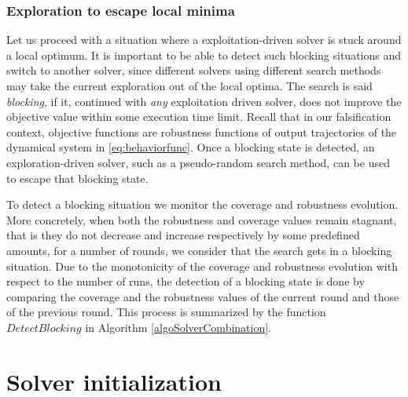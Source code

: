 
\subsubsection*{Exploration to escape local minima}
Let us proceed with a situation where a exploitation-driven solver is stuck around a local optimum. It is important to be able to detect such blocking situations and switch to another solver, since different solvers using different search methods may take the current exploration out of the local optima. The search is said {\em blocking}, if it, continued with {\em any} exploitation driven solver, does not improve the objective value within some execution time limit. Recall that in our falsification context, objective functions are robustness functions of output trajectories of the dynamical system in \ref{eq:behaviorfunc}. Once a blocking state is detected, an exploration-driven solver, such as a pseudo-random search method, can be used to escape that blocking state. 


To detect a blocking situation we monitor the coverage and robustness evolution. More concretely, when both the robustness and coverage values remain stagnant, that is they do not decrease and increase respectively by some predefined amounts, for a number of rounds, we consider that the search gets in a blocking situation. Due to the monotonicity of the coverage and robustness evolution with respect to the number of runs, the detection of a blocking state is done by comparing the coverage and the robustness values of the current round and those of the previous round. This process is summarized by the function $DetectBlocking$ in Algorithm \ref{algoSolverCombination}.


\section{Solver initialization}\label{sec:init}

